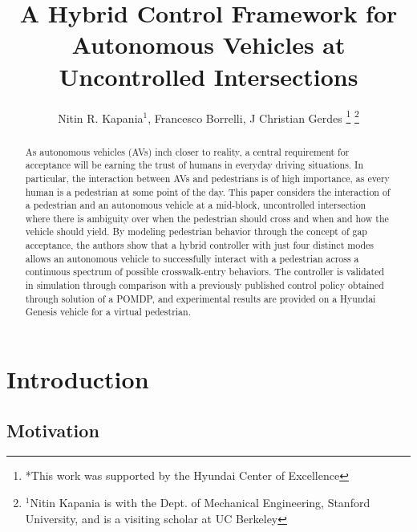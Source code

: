 \documentclass[letterpaper, 10 pt, conference]{ieeeconf}  %
\title{\LARGE \bf
A Hybrid Control Framework for Autonomous Vehicles at Uncontrolled Intersections}
\author{Nitin R. Kapania$^{1}$, Francesco Borrelli, J Christian Gerdes%
\thanks{*This work was supported by the Hyundai Center of Excellence}%
\thanks{$^{1}$Nitin Kapania is with the Dept. of Mechanical Engineering, Stanford University, and is a visiting scholar at UC Berkeley}%
}
\begin{document}
\maketitle
\thispagestyle{empty}
\pagestyle{empty}


\begin{abstract}

As autonomous vehicles (AVs) inch closer to reality, a central requirement for acceptance will be earning the trust of humans in everyday driving situations. In particular, the interaction between AVs and pedestrians is of
high importance, as every human is a pedestrian at some point of the day. This paper considers the interaction of a pedestrian and an autonomous vehicle at a mid-block, uncontrolled intersection where there is ambiguity
over when the pedestrian should cross and when and how the vehicle should yield. By modeling pedestrian behavior through the concept of gap acceptance, the authors show that a hybrid controller with just four distinct modes allows an autonomous vehicle to successfully interact with a pedestrian across a continuous spectrum of possible crosswalk-entry behaviors. The controller is validated in simulation through comparison with a previously published control policy obtained through solution of a POMDP, and experimental results are provided on a Hyundai Genesis vehicle for a virtual pedestrian.  

\end{abstract}


\section{Introduction}

\subsection{Motivation}
\end{document}
